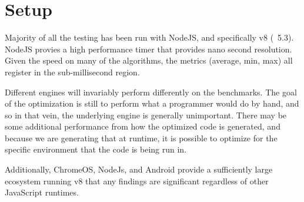 \section{Setup}

Majority of all the testing has been run with NodeJS, and specifically v8 (~5.3).  NodeJS provies a high performance timer that provides nano second resolution.  Given the speed on many of the algorithms, the metrics (average, min, max) all register in the sub-millisecond region.  

Different engines will invariably perform differently on the benchmarks.  The goal of the optimization is still to perform what a programmer would do by hand, and so in that vein, the underlying engine is generally unimportant.  There may be some additional performance from how the optimized code is generated, and because we are generating that at runtime, it is possible to optimize for the specific environment that the code is being run in.  

Additionally, ChromeOS, NodeJs, and Android provide a sufficiently large ecosystem running v8 that any findings are significant regardless of other JavaScript runtimes.

